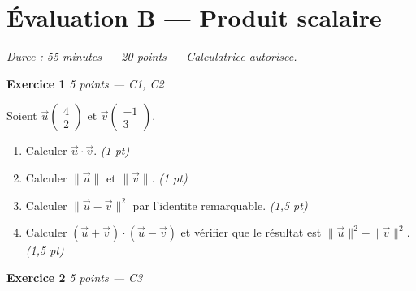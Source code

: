 
\section*{Évaluation B — Produit scalaire}

\textit{Duree : 55 minutes — 20 points — Calculatrice autorisee.}

\bigskip

\textbf{Exercice 1} \hfill \textit{5 points — C1, C2}

Soient $\vec{u}\begin{pmatrix} 4 \\ 2 \end{pmatrix}$ et $\vec{v}\begin{pmatrix} -1 \\ 3 \end{pmatrix}$.

\begin{enumerate}
  \item Calculer $\vec{u} \cdot \vec{v}$. \hfill \textit{(1 pt)}
  \item Calculer $\|\vec{u}\|$ et $\|\vec{v}\|$. \hfill \textit{(1 pt)}
  \item Calculer $\|\vec{u} - \vec{v}\|^2$ par l'identite remarquable. \hfill \textit{(1,5 pt)}
  \item Calculer $(\vec{u} + \vec{v}) \cdot (\vec{u} - \vec{v})$ et vérifier que le résultat est $\|\vec{u}\|^2 - \|\vec{v}\|^2$. \hfill \textit{(1,5 pt)}
\end{enumerate}


\bigskip

\textbf{Exercice 2} \hfill \textit{5 points — C3}

